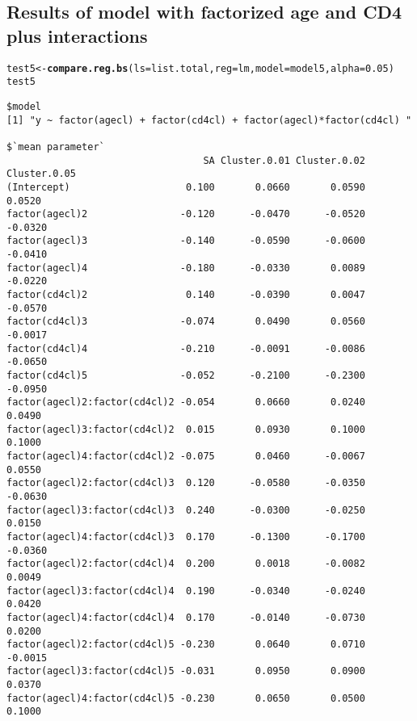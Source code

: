 \documentclass[]{revtex4}\usepackage[]{graphicx}\usepackage[]{color}
\makeatletter
\newcommand{\hlnum}[1]{\textcolor[rgb]{0.686,0.059,0.569}{#1}}%
\newcommand{\hlstd}[1]{\textcolor[rgb]{0.345,0.345,0.345}{#1}}%
\newcommand{\hlkwb}[1]{\textcolor[rgb]{0.69,0.353,0.396}{#1}}%
\newcommand{\hlkwc}[1]{\textcolor[rgb]{0.333,0.667,0.333}{#1}}%
\newcommand{\hlkwd}[1]{\textcolor[rgb]{0.737,0.353,0.396}{\textbf{#1}}}%
\newenvironment{kframe}{%
 \def\at@end@of@kframe{}%
 \ifinner\ifhmode%
  \def\at@end@of@kframe{\end{minipage}}%
  \begin{minipage}{\columnwidth}%
 \fi\fi%
 \def\FrameCommand##1{\hskip\@totalleftmargin \hskip-\fboxsep
 \colorbox{shadecolor}{##1}\hskip-\fboxsep
     \hskip-\linewidth \hskip-\@totalleftmargin \hskip\columnwidth}%
 \MakeFramed {\advance\hsize-\width
   \@totalleftmargin\z@ \linewidth\hsize
   \@setminipage}}%
 {\par\unskip\endMakeFramed%
 \at@end@of@kframe}
\newenvironment{knitrout}{}{} %
\makeatother
\begin{document}
\subsection*{Results of model with factorized age and CD4 plus interactions}
\begin{knitrout}
\color{fgcolor}\begin{kframe}
\begin{alltt}
\hlstd{test5} \hlkwb{<-} \hlkwd{compare.reg.bs}\hlstd{(}\hlkwc{ls} \hlstd{= list.total,} \hlkwc{reg} \hlstd{= lm,} \hlkwc{model} \hlstd{= model5,} \hlkwc{alpha} \hlstd{=} \hlnum{0.05}\hlstd{)}
\hlstd{test5}
\end{alltt}
\begin{verbatim}
$model
[1] "y ~ factor(agecl) + factor(cd4cl) + factor(agecl)*factor(cd4cl) "

$`mean parameter`
                                  SA Cluster.0.01 Cluster.0.02 Cluster.0.05
(Intercept)                    0.100       0.0660       0.0590       0.0520
factor(agecl)2                -0.120      -0.0470      -0.0520      -0.0320
factor(agecl)3                -0.140      -0.0590      -0.0600      -0.0410
factor(agecl)4                -0.180      -0.0330       0.0089      -0.0220
factor(cd4cl)2                 0.140      -0.0390       0.0047      -0.0570
factor(cd4cl)3                -0.074       0.0490       0.0560      -0.0017
factor(cd4cl)4                -0.210      -0.0091      -0.0086      -0.0650
factor(cd4cl)5                -0.052      -0.2100      -0.2300      -0.0950
factor(agecl)2:factor(cd4cl)2 -0.054       0.0660       0.0240       0.0490
factor(agecl)3:factor(cd4cl)2  0.015       0.0930       0.1000       0.1000
factor(agecl)4:factor(cd4cl)2 -0.075       0.0460      -0.0067       0.0550
factor(agecl)2:factor(cd4cl)3  0.120      -0.0580      -0.0350      -0.0630
factor(agecl)3:factor(cd4cl)3  0.240      -0.0300      -0.0250       0.0150
factor(agecl)4:factor(cd4cl)3  0.170      -0.1300      -0.1700      -0.0360
factor(agecl)2:factor(cd4cl)4  0.200       0.0018      -0.0082       0.0049
factor(agecl)3:factor(cd4cl)4  0.190      -0.0340      -0.0240       0.0420
factor(agecl)4:factor(cd4cl)4  0.170      -0.0140      -0.0730       0.0200
factor(agecl)2:factor(cd4cl)5 -0.230       0.0640       0.0710      -0.0015
factor(agecl)3:factor(cd4cl)5 -0.031       0.0950       0.0900       0.0370
factor(agecl)4:factor(cd4cl)5 -0.230       0.0650       0.0500       0.1000


\end{verbatim}
\end{kframe}
\end{knitrout}
\end{document}
